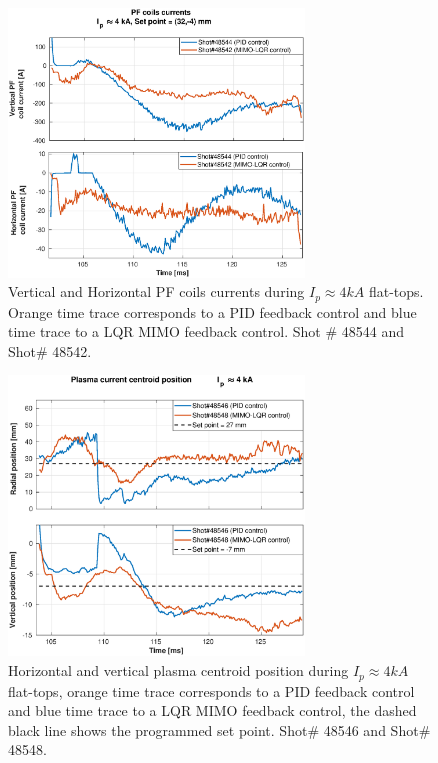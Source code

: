 \begin{figure}
	\centering
	\includegraphics[width=0.7\textwidth]{Chp5/PIDvsMIMO_544_542_curr_2.eps}
	\caption{   Vertical and Horizontal PF coils currents during  $I_p\approx 4kA$  flat-tops. Orange time trace corresponds to a PID feedback control and blue time trace to a LQR MIMO feedback control. Shot $\#$ 48544 and Shot$\#$ 48542.}
\end{figure}

\begin{figure}
	\centering
	\includegraphics[width=0.7\textwidth]{Chp5/PIDvsMIMO_546_548_2.eps}
	\caption{Horizontal and vertical plasma centroid position during  $I_p\approx 4kA$  flat-tops, orange time trace corresponds to a PID feedback control and blue time trace to a LQR MIMO feedback control, the dashed black line shows the programmed set point.  Shot$ \# $ 48546 and Shot$ \#  $48548.}
\end{figure}

